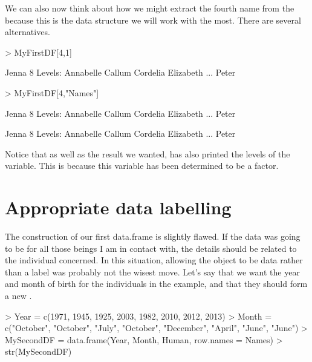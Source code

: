 We can also now think about how we might extract the fourth name from the  because this is the data structure we will work with the most. There are several alternatives.
\begin{Schunk}
\begin{Sinput}
> MyFirstDF[4,1]
\end{Sinput}
\begin{Soutput}
[1] Jenna
8 Levels: Annabelle Callum Cordelia Elizabeth ... Peter
\end{Soutput}
\begin{Sinput}
> MyFirstDF[4,"Names"]
\end{Sinput}
\begin{Soutput}
[1] Jenna
8 Levels: Annabelle Callum Cordelia Elizabeth ... Peter
\end{Soutput}
\begin{Soutput}
[1] Jenna
8 Levels: Annabelle Callum Cordelia Elizabeth ... Peter
\end{Soutput}
\end{Schunk}

Notice that as well as the result we wanted, \R{} has also printed the levels of the  variable. This is because this variable has been determined to be a factor.



\section{Appropriate data labelling}

The construction of our first data.frame is slightly flawed. If the  data was going to be for all those beings I am in contact with, the details should be related to the individual concerned. In this situation, allowing the  object to be data rather than a label was probably not the wisest move. Let's say that we want the year and month of birth for the individuals in the example, and that they should form a new .
\begin{Schunk}
\begin{Sinput}
> Year = c(1971, 1945, 1925, 2003, 1982, 2010, 2012, 2013)
> Month = c("October", "October", "July", "October", "December", "April", "June", "June")
> MySecondDF = data.frame(Year, Month, Human, row.names = Names)
> str(MySecondDF)
\end{Sinput}
\end{Schunk}

